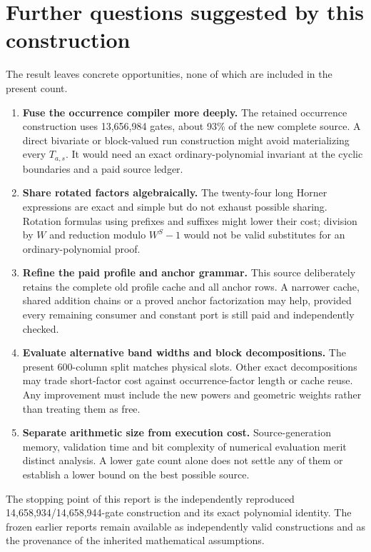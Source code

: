 \documentclass[11pt,letterpaper]{article}
\makeatletter
\theoremstyle{definition}\newtheorem{definition}[theorem]{Definition}
\theoremstyle{remark}\newtheorem{remark}[theorem]{Remark}
\newcommand{\ptrR}{}
\newcommand{\ptrappendix}{%
  \setcounter{section}{0}\def\Hy@chapapp{appendix}%
  \renewcommand{\thesection}{\ptrR.\Alph{section}}%
  \renewcommand{\theHsection}{\ptrR.\Alph{section}}}
\makeatother
\begin{document}
\section{Further questions suggested by this construction}\label{ptr:fu:sec:questions}
The result leaves concrete opportunities, none of which are included in the present count.
\begin{enumerate}
\item \textbf{Fuse the occurrence compiler more deeply.} The retained occurrence construction uses 13,656,984 gates, about 93\% of the new complete source. A direct bivariate or block-valued run construction might avoid materializing every $T_{a,s}$. It would need an exact ordinary-polynomial invariant at the cyclic boundaries and a paid source ledger.
\item \textbf{Share rotated factors algebraically.} The twenty-four long Horner expressions are exact and simple but do not exhaust possible sharing. Rotation formulas using prefixes and suffixes might lower their cost; division by $W$ and reduction modulo $W^S-1$ would not be valid substitutes for an ordinary-polynomial proof.
\item \textbf{Refine the paid profile and anchor grammar.} This source deliberately retains the complete old profile cache and all anchor rows. A narrower cache, shared addition chains or a proved anchor factorization may help, provided every remaining consumer and constant port is still paid and independently checked.
\item \textbf{Evaluate alternative band widths and block decompositions.} The present 600-column split matches physical slots. Other exact decompositions may trade short-factor cost against occurrence-factor length or cache reuse. Any improvement must include the new powers and geometric weights rather than treating them as free.
\item \textbf{Separate arithmetic size from execution cost.} Source-generation memory, validation time and bit complexity of numerical evaluation merit distinct analysis. A lower gate count alone does not settle any of them or establish a lower bound on the best possible source.
\end{enumerate}
The stopping point of this report is the independently reproduced 14,658,934/14,658,944-gate construction and its exact polynomial identity. The frozen earlier reports remain available as independently valid constructions and as the provenance of the inherited mathematical assumptions.

\ptrappendix
\end{document}
